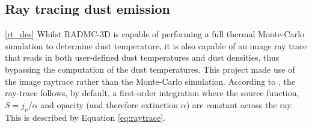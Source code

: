 \documentclass{report}
\begin{document}

\subsection{Ray tracing dust emission} \ref{rt_des}
Whilst RADMC-3D is capable of performing a full thermal Monte-Carlo simulation to determine dust temperature, it is also capable of an image ray trace that reads in both user-defined dust temperatures and dust densities, thus bypassing the computation of the dust temperatures. This project made use of the image raytrace rather than the Monte-Carlo simulation. According to \textcite{manual}, the ray-trace follows, by default, a first-order integration where the source function, $S = j_{\nu}/\alpha$ and opacity (and therefore extinction $\alpha$) are constant across the ray. This is described by Equation \ref{eq:raytrace}.
\end{document}
